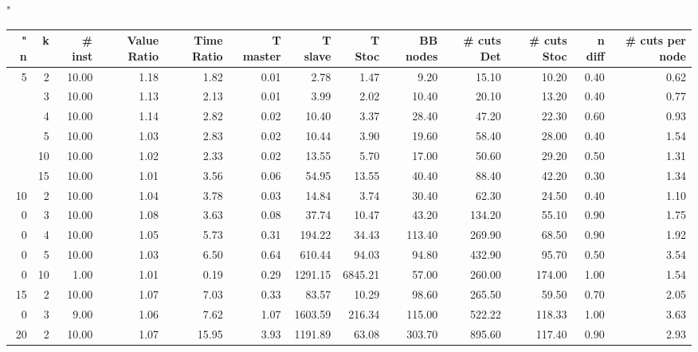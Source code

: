 \documentclass[10pt,a4paper]{article}
\begin{document}
\begin{sidewaystable} %
				
"\begin{tabular}{rrrrrrrrrrrrr}																"																										
n	&	k	&	\# inst	&	Value Ratio	&	Time Ratio	&	T master	&	T slave	&	T Stoc	&	BB nodes	&	\# cuts Det	&	\# cuts Stoc	&	n diff	&	\# cuts per node	\\	\hline
5	&	2	&	10.00	&	1.18	&	1.82	&	0.01	&	2.78	&	1.47	&	9.20	&	15.10	&	10.20	&	0.40	&	0.62	\\	
	&	3	&	10.00	&	1.13	&	2.13	&	0.01	&	3.99	&	2.02	&	10.40	&	20.10	&	13.20	&	0.40	&	0.77	\\	
	&	4	&	10.00	&	1.14	&	2.82	&	0.02	&	10.40	&	3.37	&	28.40	&	47.20	&	22.30	&	0.60	&	0.93	\\	
	&	5	&	10.00	&	1.03	&	2.83	&	0.02	&	10.44	&	3.90	&	19.60	&	58.40	&	28.00	&	0.40	&	1.54	\\	
	&	10	&	10.00	&	1.02	&	2.33	&	0.02	&	13.55	&	5.70	&	17.00	&	50.60	&	29.20	&	0.50	&	1.31	\\	
	&	15	&	10.00	&	1.01	&	3.56	&	0.06	&	54.95	&	13.55	&	40.40	&	88.40	&	42.20	&	0.30	&	1.34	\\	\hline
10	&	2	&	10.00	&	1.04	&	3.78	&	0.03	&	14.84	&	3.74	&	30.40	&	62.30	&	24.50	&	0.40	&	1.10	\\	
0	&	3	&	10.00	&	1.08	&	3.63	&	0.08	&	37.74	&	10.47	&	43.20	&	134.20	&	55.10	&	0.90	&	1.75	\\	
0	&	4	&	10.00	&	1.05	&	5.73	&	0.31	&	194.22	&	34.43	&	113.40	&	269.90	&	68.50	&	0.90	&	1.92	\\	
0	&	5	&	10.00	&	1.03	&	6.50	&	0.64	&	610.44	&	94.03	&	94.80	&	432.90	&	95.70	&	0.50	&	3.54	\\	
0	&	10	&	1.00	&	1.01	&	0.19	&	0.29	&	1291.15	&	6845.21	&	57.00	&	260.00	&	174.00	&	1.00	&	1.54	\\	\hline
15	&	2	&	10.00	&	1.07	&	7.03	&	0.33	&	83.57	&	10.29	&	98.60	&	265.50	&	59.50	&	0.70	&	2.05	\\	
0	&	3	&	9.00	&	1.06	&	7.62	&	1.07	&	1603.59	&	216.34	&	115.00	&	522.22	&	118.33	&	1.00	&	3.63	\\	
20	&	2	&	10.00	&	1.07	&	15.95	&	3.93	&	1191.89	&	63.08	&	303.70	&	895.60	&	117.40	&	0.90	&	2.93	\\	
\end{tabular}																										
\end{sidewaystable} %
		
\end{document}
